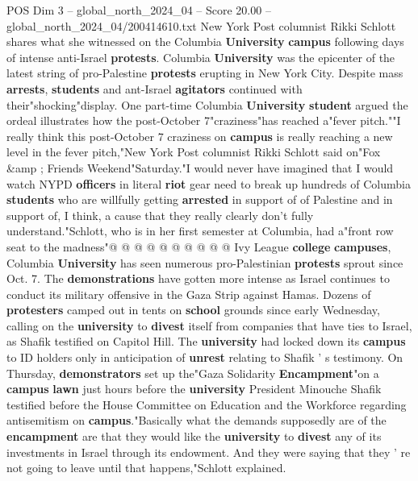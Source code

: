 \begin{textsample}{POS Dim 3 – global\_north\_2024\_04 – Score 20.00 – global\_north\_2024\_04/200414610.txt}  \label{ex:f3_pos_059}
New York Post columnist Rikki Schlott shares what she witnessed on the Columbia \textbf{University} \textbf{campus} following days of intense anti-Israel \textbf{protests}.
Columbia \textbf{University} was the epicenter of the latest string of pro-Palestine \textbf{protests} erupting in New York City.
Despite mass \textbf{arrests}, \textbf{students} and ant-Israel \textbf{agitators} continued with their"shocking"display.
One part-time Columbia \textbf{University} \textbf{student} argued the ordeal illustrates how the post-October 7"craziness"has reached a"fever pitch.""I really think this post-October 7 craziness on \textbf{campus} is really reaching a new level in the fever pitch,"New York Post columnist Rikki Schlott said on"Fox \&amp ; Friends Weekend"Saturday."I would never have imagined that I would watch NYPD \textbf{officers} in literal \textbf{riot} gear need to break up hundreds of Columbia \textbf{students} who are willfully getting \textbf{arrested} in support of of Palestine and in support of, I think, a cause that they really clearly don't fully understand."Schlott, who is in her first semester at Columbia, had a"front row seat to the madness"@ @ @ @ @ @ @ @ @ @ Ivy League \textbf{college} \textbf{campuses}, Columbia \textbf{University} has seen numerous pro-Palestinian \textbf{protests} sprout since Oct. 7.
The \textbf{demonstrations} have gotten more intense as Israel continues to conduct its military offensive in the Gaza Strip against Hamas.
Dozens of \textbf{protesters} camped out in tents on \textbf{school} grounds since early Wednesday, calling on the \textbf{university} to \textbf{divest} itself from companies that have ties to Israel, as Shafik testified on Capitol Hill.
The \textbf{university} had locked down its \textbf{campus} to ID holders only in anticipation of \textbf{unrest} relating to Shafik ' s testimony.
On Thursday, \textbf{demonstrators} set up the"Gaza Solidarity \textbf{Encampment}"on a \textbf{campus} \textbf{lawn} just hours before the \textbf{university} President Minouche Shafik testified before the House Committee on Education and the Workforce regarding antisemitism on \textbf{campus}."Basically what the demands supposedly are of the \textbf{encampment} are that they would like the \textbf{university} to \textbf{divest} any of its investments in Israel through its endowment.
And they were saying that they ' re not going to leave until that happens,"Schlott explained.

\end{textsample}
